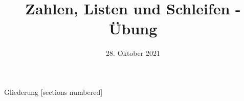 



\title{Zahlen, Listen und Schleifen - Übung}
\date{28. Oktober 2021}


\maketitle

\begin{frame}{Gliederung}
	[sections numbered]
	\tableofcontents
\end{frame}





